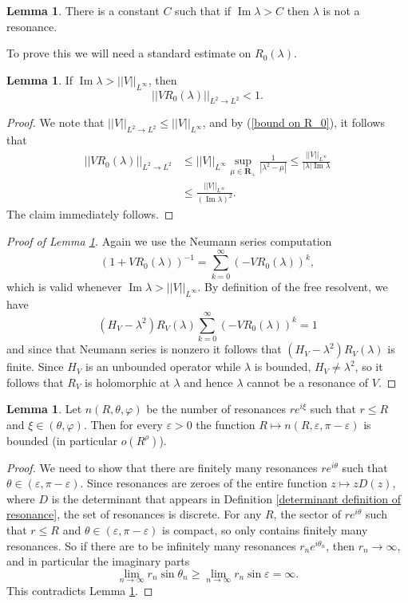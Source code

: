 \documentclass[12pt]{report}
\newcommand{\RR}{\mathbf{R}}
\renewcommand{\Im}{\operatorname{Im}}
\theoremstyle{definition}
\newtheorem{lemma}[theorem]{Lemma}
\begin{document}
\begin{lemma}
\label{no resonances of large imaginary part}
There is a constant $C$ such that if $\Im \lambda > C$ then $\lambda$ is not a resonance.
\end{lemma}
To prove this we will need a standard estimate on $R_0(\lambda)$.
\begin{lemma}
If $\Im \lambda > ||V||_{L^\infty}$, then
$$||VR_0(\lambda)||_{L^2 \to L^2} < 1.$$
\end{lemma}
\begin{proof}
We note that $||V||_{L^2 \to L^2} \leq ||V||_{L^\infty}$, and by (\ref{bound on R_0}), it follows that
\begin{align*}||VR_0(\lambda)||_{L^2 \to L^2} &\leq ||V||_{L^\infty} \sup_{\mu \in \RR_+} \frac{1}{|\lambda^2 - \mu|} \leq \frac{||V||_{L^\infty}}{|\lambda| \Im \lambda}
\\&\leq \frac{||V||_{L^\infty}}{(\Im \lambda)^2}.\end{align*}
The claim immediately follows.
\end{proof}

\begin{proof}[Proof of Lemma \ref{no resonances of large imaginary part}]
Again we use the Neumann series computation
$$(1 + VR_0(\lambda))^{-1} = \sum_{k=0}^\infty (-VR_0(\lambda))^k,$$
which is valid whenever $\Im \lambda > ||V||_{L^\infty}$. By definition of the free resolvent, we have
$$(H_V - \lambda^2)R_V(\lambda)\sum_{k=0}^\infty (-VR_0(\lambda))^k = 1$$
and since that Neumann series is nonzero it follows that $(H_V - \lambda^2)R_V(\lambda)$ is finite.
Since $H_V$ is an unbounded operator while $\lambda$ is bounded, $H_V \neq \lambda^2$, so it follows that $R_V$ is holomorphic at $\lambda$ and hence $\lambda$ cannot be a resonance of $V$.
\end{proof}

\begin{lemma}
\label{density zero in upper half plane}
Let $n(R, \theta, \varphi)$ be the number of resonances $re^{i\xi}$ such that $r \leq R$ and $\xi \in (\theta, \varphi).$
Then for every $\varepsilon > 0$ the function $R \mapsto n(R, \varepsilon, \pi - \varepsilon)$ is bounded (in particular $o(R^\rho)$).
\end{lemma}
\begin{proof}
We need to show that there are finitely many resonances $re^{i\theta}$ such that $\theta \in (\varepsilon, \pi - \varepsilon)$.
Since resonances are zeroes of the entire function $z \mapsto zD(z)$, where $D$ is the determinant that appears in Definition \ref{determinant definition of resonance}, the set of resonances is discrete.
For any $R$, the sector of $re^{i\theta}$ such that $r \leq R$ and $\theta \in (\varepsilon, \pi - \varepsilon)$ is compact, so only contains finitely many resonances.
So if there are to be infinitely many resonances $r_ne^{i\theta_n}$, then $r_n \to \infty$, and in particular the imaginary parts
$$\lim_{n \to \infty} r_n \sin \theta_n \geq \lim_{n \to \infty} r_n \sin \varepsilon = \infty.$$
This contradicts Lemma \ref{no resonances of large imaginary part}.
\end{proof}
\end{document}
